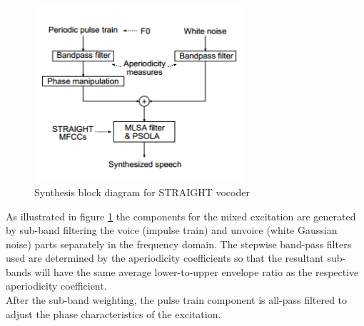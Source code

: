 \begin{figure}[htb]
	\begin{center}
	\includegraphics[width=0.7\textwidth]{img/ssynb.png}
	\end{center}
	\caption{\label{ssynb}Synthesis block diagram for STRAIGHT vocoder \cite{tuomo}}
\end{figure}
As illustrated in figure \ref{ssynb} the components for the mixed excitation are generated by sub-band filtering the voice (impulse train) and unvoice (white Gaussian noise) parts separately in the frequency domain. The stepwise band-pass filters used are determined by the aperiodicity coefficients so that the resultant sub-bands will have the same average lower-to-upper envelope ratio as the respective aperiodicity coefficient.\\
After the sub-band weighting, the pulse train component is all-pass filtered to adjust the phase characteristics of the excitation.